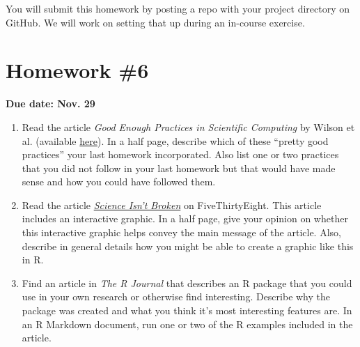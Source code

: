 \documentclass[]{book}
\theoremstyle{definition}
\theoremstyle{definition}
\theoremstyle{definition}
\theoremstyle{remark}
\begin{document}
You will submit this homework by posting a repo with your project
directory on GitHub. We will work on setting that up during an in-course
exercise.

\section{Homework \#6}\label{homework-6}

\textbf{Due date: Nov. 29}

\begin{enumerate}
\def\labelenumi{\arabic{enumi}.}
\item
  Read the article \emph{Good Enough Practices in Scientific Computing}
  by Wilson et al. (available
  \href{https://arxiv.org/abs/1609.00037}{here}). In a half page,
  describe which of these ``pretty good practices'' your last homework
  incorporated. Also list one or two practices that you did not follow
  in your last homework but that would have made sense and how you could
  have followed them.
\item
  Read the article
  \href{http://fivethirtyeight.com/features/science-isnt-broken/}{\emph{Science
  Isn't Broken}} on FiveThirtyEight. This article includes an
  interactive graphic. In a half page, give your opinion on whether this
  interactive graphic helps convey the main message of the article.
  Also, describe in general details how you might be able to create a
  graphic like this in R.
\item
  Find an article in \emph{The R Journal} that describes an R package
  that you could use in your own research or otherwise find interesting.
  Describe why the package was created and what you think it's most
  interesting features are. In an R Markdown document, run one or two of
  the R examples included in the article.
\end{enumerate}



\backmatter
\printindex
\end{document}
